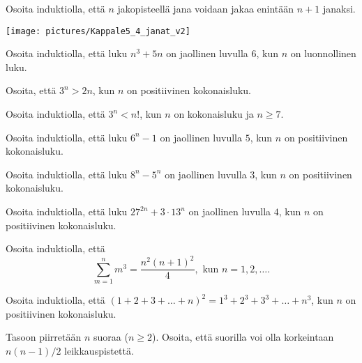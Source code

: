 \begin{kotitehtavasivu}

\begin{tehtava}
	Osoita induktiolla, että $n$ jakopisteellä jana voidaan jakaa enintään $n + 1$ janaksi.

	\begin{center}
	\texttt{[image: pictures/Kappale5\_4\_janat\_v2]}
	\end{center}
\end{tehtava}

\begin{tehtava}
	Osoita induktiolla, että luku $n^3 + 5n$ on jaollinen luvulla $6$, kun $n$ on luonnollinen luku.
\end{tehtava}

\begin{tehtava}
	Osoita, että $3^n > 2n$, kun $n$ on positiivinen kokonaisluku.
\end{tehtava}

\begin{tehtava}
	Osoita induktiolla, että $3^n < n!$, kun $n$ on kokonaisluku ja $n\ge 7$.
\end{tehtava}

\begin{tehtava}
	Osoita induktiolla, että luku $6^n - 1$ on jaollinen luvulla $5$, kun $n$ on positiivinen kokonaisluku.
\end{tehtava}

\begin{tehtava}
	Osoita induktiolla, että luku $8^n - 5^n$ on jaollinen luvulla $3$, kun $n$ on positiivinen kokonaisluku.
\end{tehtava}

\begin{tehtava}
	Osoita induktiolla, että luku $27^{2n} + 3 \cdot 13^{n}$ on jaollinen luvulla $4$, kun $n$ on positiivinen kokonaisluku.
\end{tehtava}

\begin{tehtava}
	Osoita induktiolla, että
	\[
	\sum_{m=1}^n m^3= \frac{n^2(n+1)^2}{4}, \textrm{ kun } n=1, 2, \ldots.
	\]
\end{tehtava}

\begin{tehtava}
	Osoita induktiolla, että $(1 + 2 + 3 +\ldots + n)^2 = 1^3 + 2^3 + 3^3 + \ldots + n^3$, kun $n$ on positiivinen kokonaisluku.
\end{tehtava}

\begin{tehtava}
	Tasoon piirretään $n$ suoraa ($n\ge 2$). Osoita, että suorilla voi olla korkeintaan $n(n - 1)/2$ leikkauspistettä.
\end{tehtava}


\end{kotitehtavasivu}
